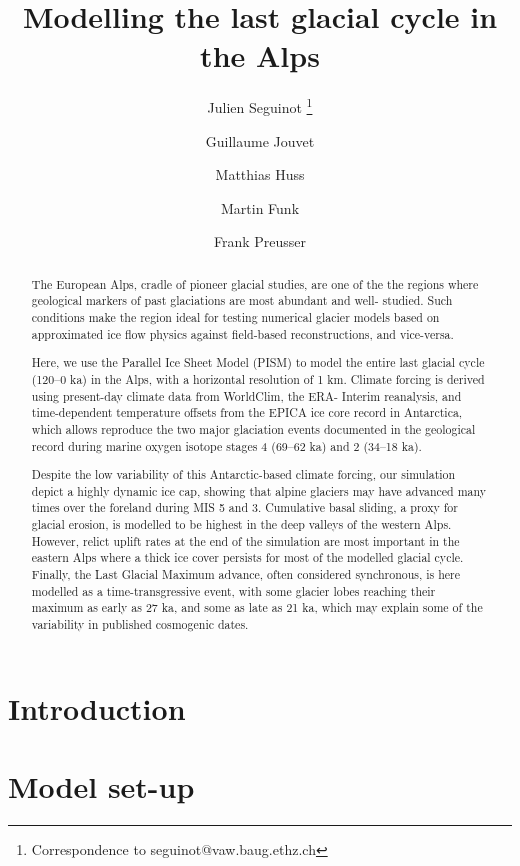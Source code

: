 \documentclass{article}
\title{Modelling the last glacial cycle in the Alps}
\author[1]{Julien Seguinot%
           \thanks{Correspondence to seguinot@vaw.baug.ethz.ch}}
\author[1]{Guillaume Jouvet}
\author[1]{Matthias Huss}
\author[1]{Martin Funk}
\author[2]{Frank Preusser}
\affil[1]{Laboratory of Hydraulics, Hydrology and Glaciology,
          ETH Zürich, Switzerland}
\affil[2]{Institute of Earth and Environmental Sciences,
          University of Freiburg, Germany}
\begin{document}

\maketitle

\begin{abstract}

    The European Alps, cradle of pioneer glacial studies, are one of the the
    regions where geological markers of past glaciations are most abundant and
    well- studied. Such conditions make the region ideal for testing numerical
    glacier models based on approximated ice flow physics against field-based
    reconstructions, and vice-versa.

    Here, we use the Parallel Ice Sheet Model (PISM) to model the entire last
    glacial cycle (120–0 ka) in the Alps, with a horizontal resolution of 1 km.
    Climate forcing is derived using present-day climate data from WorldClim,
    the ERA- Interim reanalysis, and time-dependent temperature offsets from
    the EPICA ice core record in Antarctica, which allows reproduce the two
    major glaciation events documented in the geological record during marine
    oxygen isotope stages 4 (69–62 ka) and 2 (34–18 ka).

    Despite the low variability of this Antarctic-based climate forcing, our
    simulation depict a highly dynamic ice cap, showing that alpine glaciers
    may have advanced many times over the foreland during MIS 5 and 3.
    Cumulative basal sliding, a proxy for glacial erosion, is modelled to be
    highest in the deep valleys of the western Alps. However, relict uplift
    rates at the end of the simulation are most important in the eastern Alps
    where a thick ice cover persists for most of the modelled glacial cycle.
    Finally, the Last Glacial Maximum advance, often considered synchronous, is
    here modelled as a time-transgressive event, with some glacier lobes
    reaching their maximum as early as 27 ka, and some as late as 21 ka, which
    may explain some of the variability in published cosmogenic dates.

\end{abstract}

\section{Introduction}

\section{Model set-up}
\end{document}
